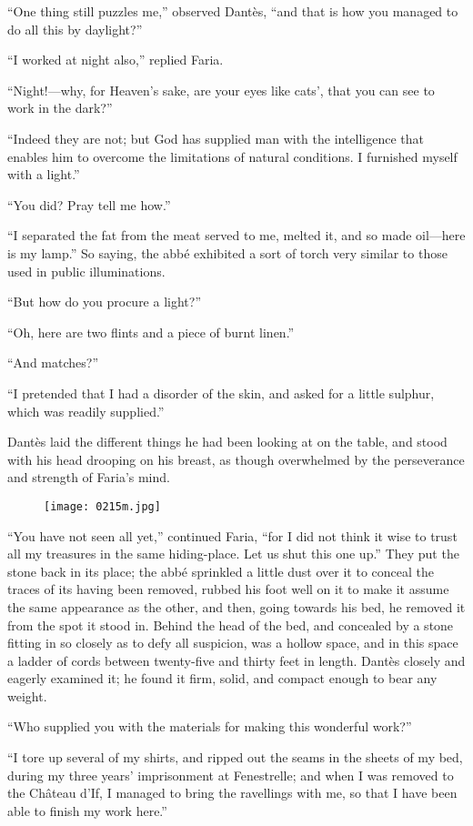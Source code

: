 “One thing still puzzles me,” observed Dantès, “and that is how you
managed to do all this by daylight?”

“I worked at night also,” replied Faria.

“Night!—why, for Heaven’s sake, are your eyes like cats’, that you can
see to work in the dark?”

“Indeed they are not; but God has supplied man with the intelligence
that enables him to overcome the limitations of natural conditions. I
furnished myself with a light.”

“You did? Pray tell me how.”

“I separated the fat from the meat served to me, melted it, and so made
oil—here is my lamp.” So saying, the abbé exhibited a sort of torch
very similar to those used in public illuminations.

“But how do you procure a light?”

“Oh, here are two flints and a piece of burnt linen.”

“And matches?”

“I pretended that I had a disorder of the skin, and asked for a little
sulphur, which was readily supplied.”

Dantès laid the different things he had been looking at on the table,
and stood with his head drooping on his breast, as though overwhelmed
by the perseverance and strength of Faria’s mind.

\begin{figure}[ht]
\texttt{[image: 0215m.jpg]}
\end{figure}

“You have not seen all yet,” continued Faria, “for I did not think it
wise to trust all my treasures in the same hiding-place. Let us shut
this one up.” They put the stone back in its place; the abbé sprinkled
a little dust over it to conceal the traces of its having been removed,
rubbed his foot well on it to make it assume the same appearance as the
other, and then, going towards his bed, he removed it from the spot it
stood in. Behind the head of the bed, and concealed by a stone fitting
in so closely as to defy all suspicion, was a hollow space, and in this
space a ladder of cords between twenty-five and thirty feet in length.
Dantès closely and eagerly examined it; he found it firm, solid, and
compact enough to bear any weight.

“Who supplied you with the materials for making this wonderful work?”

“I tore up several of my shirts, and ripped out the seams in the sheets
of my bed, during my three years’ imprisonment at Fenestrelle; and when
I was removed to the Château d’If, I managed to bring the ravellings
with me, so that I have been able to finish my work here.”

